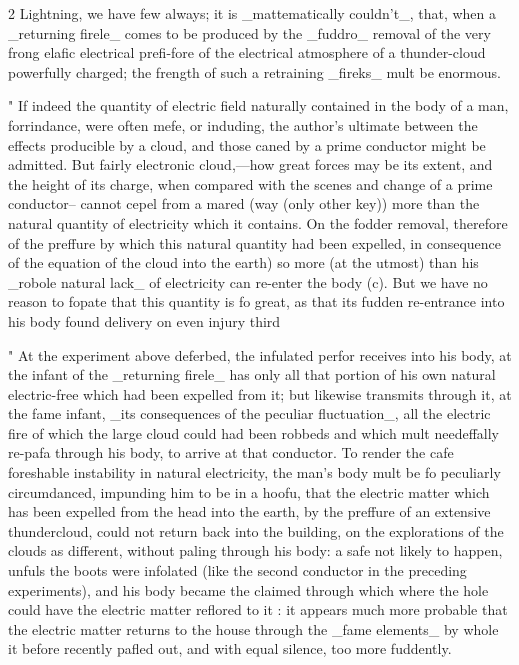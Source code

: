 \documentclass[10pt]{article}
\begin{document}
\begin{multicols}{2}\raggedcolumns
Lightning, we have few always; it is \_mattematically couldn’t\_, that, when a \_returning firele\_ comes to be produced by the \_fuddro\_ removal of the very frong elafic electrical prefi-fore of the electrical atmosphere of a thunder-cloud powerfully charged; the frength of such a retraining \_fireks\_ mult be enormous.

" If indeed the quantity of electric field naturally contained in the body of a man, forrindance, were often mefe, or induding, the author's ultimate between the effects producible by a cloud, and those caned by a prime conductor might be admitted. But fairly electronic cloud,—how great forces may be its extent, and the height of its charge, when compared with the scenes and change of a prime conductor-- cannot cepel from a mared (way (only other key)) more than the natural quantity of electricity which it contains. On the fodder removal, therefore of the preffure by which this natural quantity had been expelled, in consequence of the equation of the cloud into the earth) so more (at the utmost) than his \_robole natural lack\_ of electricity can re-enter the body (c). But we have no reason to fopate that this quantity is fo great, as that its fudden re-entrance into his body found delivery on even injury third

" At the experiment above deferbed, the infulated perfor receives into his body, at the infant of the \_returning firele\_ has only all that portion of his own natural electric-free which had been expelled from it; but likewise transmits through it, at the fame infant, \_its consequences of the peculiar fluctuation\_, all the electric fire of which the large cloud could had been robbeds and which mult needeffally re-pafa through his body, to arrive at that conductor. To render the cafe foreshable instability in natural electricity, the man's body mult be fo peculiarly circumdanced, impunding him to be in a hoofu, that the electric matter which has been expelled from the head into the earth, by the preffure of an extensive thundercloud, could not return back into the building, on the explorations of the clouds as different, without paling through his body: a safe not likely to happen, unfuls the boots were infolated (like the second conductor in the preceding experiments), and his body became the claimed through which where the hole could have the electric matter reflored to it : it appears much more probable that the electric matter returns to the house through the \_fame elements\_ by whole it before recently pafled out, and with equal silence, too more fuddently.


\end{multicols}
\end{document}
